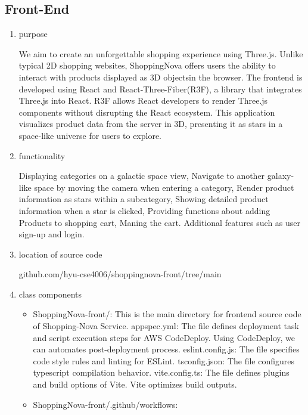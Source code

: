 \documentclass[conference]{IEEEtran}
\begin{document}
\subsection{Front-End}
\begin{enumerate}
\setlength{\parindent}{2ex}
\item purpose

We aim to create an unforgettable shopping experience using Three.js.
Unlike typical 2D shopping websites, ShoppingNova offers users the ability to interact with products displayed as 3D objectsin the browser.
The frontend is developed using React and React-Three-Fiber(R3F), a library that integrates Three.js into React.
R3F allows React developers to render Three.js components without disrupting the React ecosystem.
This application visualizes product data from the server in 3D, presenting it as stars in a space-like universe for users to explore.

\item functionality

Displaying categories on a galactic space view, Navigate to another galaxy-like space by moving the camera when entering a category, Render product information as stars within a subcategory, Showing detailed product information when a star is clicked, Providing functions about adding Products to shopping cart, Maning the cart. Additional features such as user sign-up and login.

\item location of source code

github.com/hyu-cse4006/shoppingnova-front/tree/main

\item class components
\begin{itemize}
\item ShoppingNova-front/: This is the main directory for frontend source code of Shopping-Nova Service.\newline
appspec.yml: The file defines deployment task and script execution steps for AWS CodeDeploy. Using CodeDeploy, we can automates post-deployment process.\newline
eslint.config.js: The file specifies code style rules and linting for ESLint.\newline
tsconfig.json: The file configures typescript compilation behavior.\newline
vite.config.ts: The file defines plugins and build options of Vite. Vite optimizes build outputs.

\item ShoppingNova-front/.github/workflows:


\end{itemize}
\end{enumerate}
\end{document}
